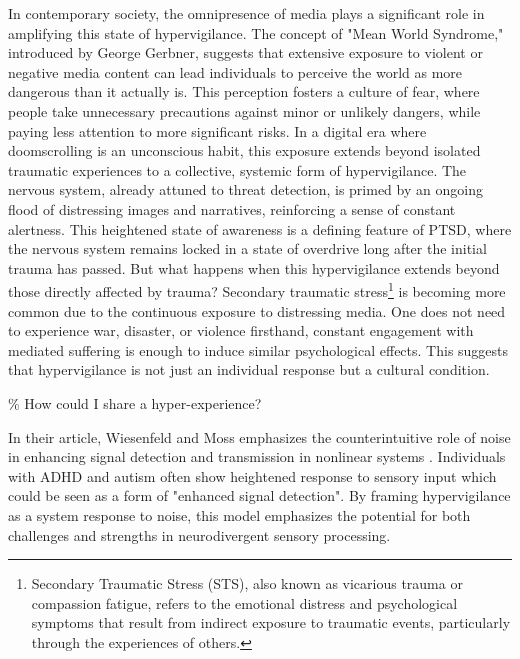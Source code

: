 In contemporary society, the omnipresence of media plays a significant role in amplifying this state of hypervigilance. The concept of "Mean World Syndrome," introduced by George Gerbner, suggests that extensive exposure to violent or negative media content can lead individuals to perceive the world as more dangerous than it actually is. This perception fosters a culture of fear, where people take unnecessary precautions against minor or unlikely dangers, while paying less attention to more significant risks. In a digital era where doomscrolling is an unconscious habit, this exposure extends beyond isolated traumatic experiences to a collective, systemic form of hypervigilance. The nervous system, already attuned to threat detection, is primed by an ongoing flood of distressing images and narratives, reinforcing a sense of constant alertness.\citep{wiki:meanworld}
% 
This heightened state of awareness is a defining feature of PTSD, where the nervous system remains locked in a state of overdrive long after the initial trauma has passed. But what happens when this hypervigilance extends beyond those directly affected by trauma? Secondary traumatic stress\footnote{Secondary Traumatic Stress (STS), also known as vicarious trauma or compassion fatigue, refers to the emotional distress and psychological symptoms that result from indirect exposure to traumatic events, particularly through the experiences of others.} is becoming more common due to the continuous exposure to distressing media. One does not need to experience war, disaster, or violence firsthand, constant engagement with mediated suffering is enough to induce similar psychological effects. This suggests that hypervigilance is not just an individual response but a cultural condition.

{\scriptsize \textcolor{comment}{\%  How could I share a hyper-experience?}}

In their article, Wiesenfeld and Moss emphasizes the counterintuitive role of noise in enhancing signal detection and transmission in nonlinear systems \citep{wiesenfeld1995}. Individuals with ADHD and autism often show heightened response to sensory input which could be seen as a form of "enhanced signal detection". By framing hypervigilance as a system response to noise, this model emphasizes the potential for both challenges and strengths in neurodivergent sensory processing.



